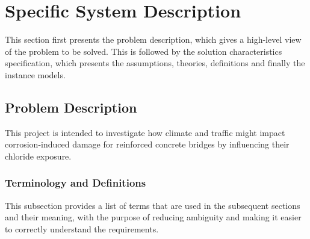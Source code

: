 \documentclass[12pt]{article}
\begin{document}
\section{Specific System Description}

This section first presents the problem description, which gives a high-level
view of the problem to be solved.  This is followed by the solution characteristics
specification, which presents the assumptions, theories, definitions and finally
the instance models.  

\subsection{Problem Description} \label{Sec_pd}
This project is intended to investigate how climate and traffic might impact corrosion-induced damage for reinforced concrete bridges by influencing their chloride exposure.

\subsubsection{Terminology and  Definitions}
This subsection provides a list of terms that are used in the subsequent
sections and their meaning, with the purpose of reducing ambiguity and making it
easier to correctly understand the requirements.
\end{document}
